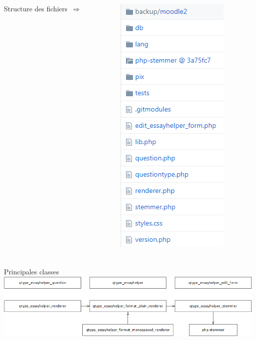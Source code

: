 \documentclass{beamer}
\begin{document}
  \begin{frame}
  \frametitle{\insertsection}

\begin{columns}
\begin{column}{0.38\textwidth}
 \alert{Structure des fichiers~$\Rightarrow$}
\end{column}
\begin{column}{0.6\textwidth}
\vspace*{-1cm}
  \begin{center}
    \includegraphics[scale=0.6]{../images/architecture.png}
  \end{center}
\end{column}
\end{columns}

  \end{frame}
  
  \begin{frame}
  \frametitle{\insertsection}
  \alert{Principales classes}
\vfill
    \hspace*{-0.75cm}\includegraphics[scale=0.475]{../images/class-simple.png}
  \end{frame}
  
\end{document}
